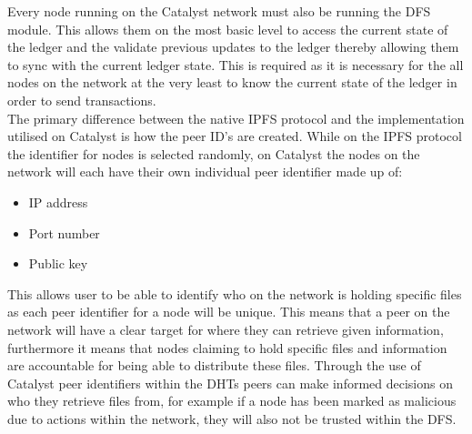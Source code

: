 Every node running on the Catalyst network must also be running the DFS module. This allows them on the most basic level to access the current state of the ledger and the validate previous updates to the ledger thereby allowing them to sync with the current ledger state. This is required as it is necessary for the all nodes on the network at the very least to know the current state of the ledger in order to send transactions. \\

The primary difference between the native IPFS protocol and the implementation utilised on Catalyst is how the peer ID's are created.  While on the IPFS protocol the identifier for nodes is selected randomly, on Catalyst the nodes on the network will each have their own individual peer identifier\cite{BytesExtentions} made up of:

\begin{itemize}
\item IP address
\item Port number
\item Public key
\end{itemize}

This allows user to be able to identify who on the network is holding specific files as each peer identifier for a node will be unique. This means that a peer on the network will have a clear target for where they can retrieve given information, furthermore it means that nodes claiming to hold specific files and information are accountable for being able to distribute these files. Through the use of Catalyst peer identifiers within the DHTs peers can make informed decisions on who they retrieve files from, for example if a node has been marked as malicious due to actions within the network, they will also not be trusted within the DFS.

